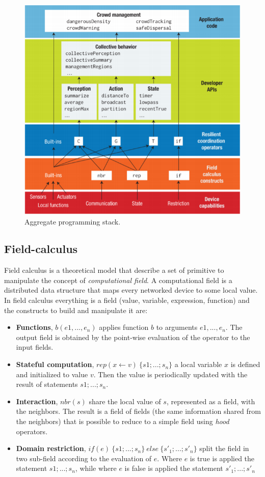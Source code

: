 \begin{figure}[h]
    \centering
    \includegraphics{figures/ACstack.png}
    \caption{Aggregate programming stack.~\cite{BealIEEEComputer2015}}
    \label{fig:ACstack}
\end{figure}

\subsection{Field-calculus}

Field calculus is a theoretical model that describe a set of primitive to manipulate the concept of \textit{computational field}. A computational field is a distributed data structure that maps every networked device to some local value. In field calculus everything is a field (value, variable, expression, function) and the constructs to build and manipulate it are:
\begin{itemize}
    \item \textbf{Functions}, $b(e1,...,e_n)$ applies function $b$ to arguments $e1,...,e_n$. The output field is obtained by the point-wise evaluation of the operator to the input fields.
    \item \textbf{Stateful computation}, $rep(x \leftarrow v)~\{s1; ... ; s_n\}$ a local variable $x$ is defined and initialized to value $v$. Then the value is periodically updated with the result of statements $s1; ... ; s_n$.
    \item \textbf{Interaction}, $nbr(s)$ share the local value of $s$, represented as a field, with the neighbors. The result is a field of fields (the same information shared from the neighbors) that is possible to reduce to a simple field using \textit{hood} operators. 
    \item \textbf{Domain restriction}, $if(e)~\{s1; ... ; s_n\}~else~\{s'_1; ... ; s'_n\}$ split the field in two sub-field according to the evaluation of $e$. Where $e$ is true is applied the statement $s1; ... ; s_n$, while where $e$ is false is applied the statement $s'_1; ... ; s'_n$
\end{itemize}

